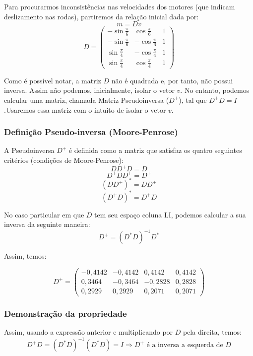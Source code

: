 \documentclass{article}
\begin{document}
Para procurarmos inconsistências nas velocidades dos motores (que indicam deslizamento nas rodas), partiremos da relação inicial dada por:
\[m = Dv\]
\[D
=
\begin{pmatrix}
  -\sin{\frac{\pi}{6}} &  \cos{\frac{\pi}{6}} & 1 \\
  -\sin{\frac{\pi}{6}} &  -\cos{\frac{\pi}{6}} &  1 \\
  \sin{\frac{\pi}{4}} & -\cos{\frac{\pi}{4}}   &  1  \\
  \sin{\frac{\pi}{4}} &  \cos{\frac{\pi}{4}} & 1
 \end{pmatrix}
\]

Como é possível notar, a matriz $D$ não é quadrada e, por tanto, não possui inversa. Assim não podemos, inicialmente, isolar o vetor $v$. No entanto, podemos calcular uma matriz, chamada Matriz Pseudoinversa ($D^+$), tal que $D^+D=I$ .Usaremos essa matriz com o intuito de isolar o vetor $v$.

\subsubsection{Definição Pseudo-inversa (Moore-Penrose)}

\hspace{1cm} A Pseudoinversa $D^+$ é definida como a matriz que satisfaz os quatro seguintes critérios (condições de Moore-Penrose):
\[DD^+D=D\]
\[D^+DD^+=D^+\]
\[(DD^+)^*=DD^+\]
\[(D^+D)^*=D^+D\]

No caso particular em que $D$ tem seu espaço coluna LI, podemos calcular a sua inversa da seguinte maneira:
\[ D^+ = (D^*D)^{-1} D^*\]

Assim, temos:

\[D^+
=
\begin{pmatrix}
  -0,4142    &-0,4142    & 0,4142    & 0,4142    \\
 0,3464 &  -0,3464 & -0,2828 & 0,2828 \\
 0,2929 & 0,2929 & 0,2071& 0,2071
 \end{pmatrix}
\]

\subsubsection{Demonstração da propriedade}

\hspace{1cm} Assim, usando a expressão anterior e multiplicando por $D$ pela direita, temos:
\[D^+D = (D^*D)^{-1}(D^*D) = I \Rightarrow D^+ \text{ é a inversa a esquerda de }D\]  
\end{document}
